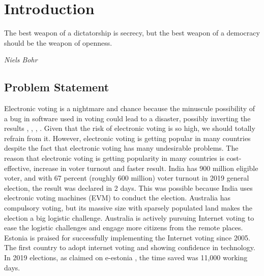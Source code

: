 \chapter{Introduction}
\label{cha:intro}

\epigraph{The best weapon of a dictatorship is secrecy, but the best weapon of a democracy should be the weapon of openness.} 
{\textit{Niels Bohr}} 

\section{Problem Statement}
   Electronic voting is a nightmare and chance because the minuscule possibility of 
   a bug in software used in voting could lead to a disaster, possibly 
   inverting the results \citep{TSwiss}
   \citep{Wolchok:2010:SAI:1866307.1866309},
   \citep{10.1007/978-3-319-22270-7_3}, \citep{ARANHA2019335},
   \citep{Feldman:2007:SAD:1323111.1323113}.
   Given that the risk of  electronic voting is 
   so high, we should totally refrain from it. However,
   electronic voting is getting popular in many countries
   despite the fact that 
   electronic voting has many undesirable problems.  The reason that 
   electronic voting is getting popularity in many countries is cost-effective, 
   increase in voter turnout  and faster result.  India has 900 million eligible voter, 
   and with 67 percent (roughly 600 million) voter turnout in 2019 general election, 
   the result was declared in 2 days. This was possible because India uses  electronic 
   voting machines (EVM) to conduct the election. Australia has 
   compulsory voting, but its massive size with sparsely populated land makes 
   the election a big logistic challenge.  Australia is actively pursuing Internet voting 
   to ease the logistic challenges and engage more citizens from the remote places. Estonia
   is praised for successfully implementing the Internet voting since 2005. The first country to
   adopt internet voting and showing confidence in technology. In 2019 elections, 
   as claimed on e-estonia \citep{Estonia},  the time saved was 11,000 working days. 
  
